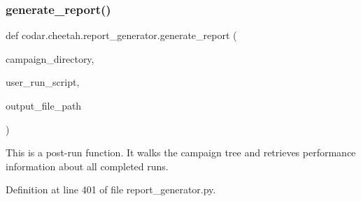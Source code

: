 \subsubsection{\texorpdfstring{generate\+\_\+report()}{generate\_report()}}
{\footnotesize\ttfamily def codar.\+cheetah.\+report\+\_\+generator.\+generate\+\_\+report (\begin{DoxyParamCaption}\item[{}]{campaign\+\_\+directory,  }\item[{}]{user\+\_\+run\+\_\+script,  }\item[{}]{output\+\_\+file\+\_\+path }\end{DoxyParamCaption})}

\begin{DoxyVerb}This is a post-run function.
It walks the campaign tree and retrieves performance information
about all completed runs.
\end{DoxyVerb}
 

Definition at line 401 of file report\+\_\+generator.\+py.

